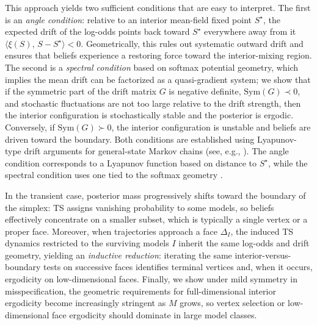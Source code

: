 \documentclass[12pt]{article}
\begin{document}
This approach yields two sufficient conditions that are easy to interpret. 
The first is an \emph{angle condition}: relative to an interior mean-field fixed point $S^\star$, the expected drift of the log-odds points back toward $S^\star$ everywhere away from it $\langle \xi(S),\, S-S^\star\rangle<0$. Geometrically, this rules out systematic outward drift and ensures that beliefs experience a restoring force toward the interior-mixing region. 
The second is a \emph{spectral condition} based on softmax potential geometry, which implies the mean drift can be factorized as a quasi-gradient system; we show that if the symmetric part of the drift matrix $G$ is negative definite, $\mathrm{Sym}(G)\prec 0$, and stochastic fluctuations are not too large relative to the drift strength, then the interior configuration is stochastically stable and the posterior is ergodic. Conversely, if $\mathrm{Sym}(G)\succ 0$, the interior configuration is unstable and beliefs are driven toward the boundary. Both conditions are established using Lyapunov-type drift arguments for general-state Markov chains (see, e.g., \citet{meynMarkovChainsStochastic1993,khasminskiiStochasticStabilityDifferential2012}). 
The angle condition corresponds to a Lyapunov function based on distance to $S^\star$, while the spectral condition uses one tied to the softmax geometry \citep{amariMethodsInformationGeometry2000}.

In the transient case, posterior mass progressively shifts toward the boundary of the simplex: TS assigns vanishing probability to some models, so beliefs effectively concentrate on a smaller subset, which is typically a single vertex or a proper face.
Moreover, when trajectories approach a face $\Delta_I$, the induced TS dynamics restricted to the surviving models $I$ inherit the same log-odds and drift geometry, yielding an \emph{inductive reduction}: iterating the same interior-versus-boundary tests on successive faces identifies terminal vertices and, when it occurs, ergodicity on low-dimensional faces. 
Finally, we show under mild symmetry in misspecification, the geometric requirements for full-dimensional interior ergodicity become increasingly stringent as $M$ grows, so vertex selection or low-dimensional face ergodicity should dominate in large model classes.
\end{document}
